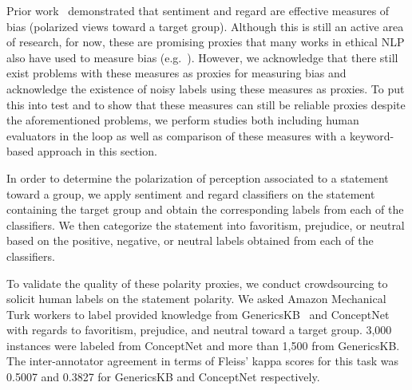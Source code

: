 Prior work~\cite{sheng2019woman} demonstrated that sentiment and regard are effective measures of bias (polarized views toward a target group).
Although this is still an active area of research, for now, these are promising proxies that many works in ethical NLP also have used to measure bias (e.g.~\citet{sheng2019woman, li2020unqover, NEURIPS2020_1457c0d6, sheng-etal-2020-towards,dhamala2021bold}). However, we acknowledge that there still exist problems with these measures as proxies for measuring bias and acknowledge the existence of noisy labels using these measures as proxies. To put this into test and to show that these measures can still be reliable proxies despite the aforementioned problems, we perform studies both including human evaluators in the loop as well as comparison of these measures with a keyword-based approach in this section. 

In order to determine the polarization of perception associated to a statement toward a group, we apply sentiment and regard classifiers on the statement containing the target group and obtain the corresponding labels from each of the classifiers. We then categorize the statement into favoritism, prejudice, or neutral based on the positive, negative, or neutral labels obtained from each of the classifiers. 

To validate the quality of these polarity proxies, we conduct crowdsourcing to solicit human labels on the statement polarity.
We asked Amazon Mechanical Turk workers to label provided knowledge from GenericsKB~\cite{bhakthavatsalam2020genericskb} and ConceptNet~\cite{speer2017conceptnet} with regards to favoritism, prejudice, and neutral toward a target group. 3,000 instances were labeled from ConceptNet and more than 1,500 from GenericsKB. The inter-annotator agreement in terms of Fleiss' kappa scores \cite{fleiss1971measuring} for this task was 0.5007 and 0.3827 for GenericsKB and ConceptNet respectively. 

\begin{table}[tb]
    \caption{Agreement of sentiment and regard labels with human annotators in terms of accuracy.}
    \label{human_vs_re_sent_generics}
\end{table}


